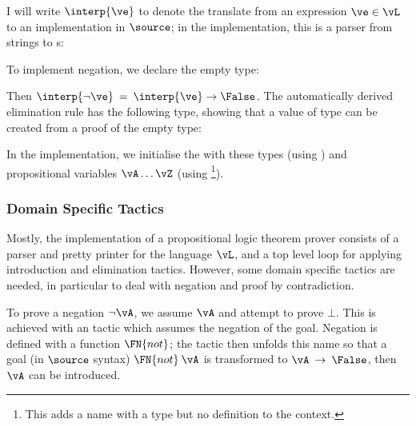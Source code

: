 \DM{
\AR{
\Data\:\Tor\:(\vA,\vB\Hab\Type)\Hab\Type\hg\Where\\
\hg\hg\ARd{
& \orintrol\Hab\fbind{\va}{\vA}{\Tor\:\vA\:\vB}\\
\mid & \orintror\Hab\fbind{\vb}{\vB}{\Tor\:\vA\:\vB}
}
}
}

I will write $\interp{\ve}$ to denote the translate from an expression
$\ve\in\vL$ to an implementation in $\source$; in the implementation,
this is a parser from strings to s:


To implement negation, we declare the empty type:

\DM{
\Data\:\False\Hab\Type\hg\Where
}

Then $\interp{\neg\ve}\:=\:\interp{\ve}\to\False$. The automatically
derived elimination rule has the following type, showing that a value
of  type can be created from a proof of the empty type:

\DM{
\Elim{\False}\Hab\fbind{\vx}{\False}{
\fbind{\motive}{\False\to\Type}{\motive\:\vx}}
}

In the implementation, we initialise the  with these
types (using ) and propositional variables
$\vA\ldots\vZ$ (using \footnote{This adds a name with
  a type but no definition to the context.}).

\subsubsection{Domain Specific Tactics}
Mostly, the implementation of a propositional logic theorem prover
consists of a parser and pretty printer for the language $\vL$, and a
top level loop for applying introduction and elimination
tactics. However, some domain
specific tactics are needed, in particular to deal with negation and
proof by contradiction. 

To prove a negation $\neg\vA$, we assume $\vA$ and attempt to prove
$\bot$. This is achieved with an  tactic which
assumes the negation of the goal. Negation is defined with a function
$\FN{not}$; the  tactic then unfolds this name so
that a goal (in $\source$ syntax) $\FN{not}\:\vA$ is transformed to
$\vA\:\to\:\False$, then $\vA$ can be introduced.

